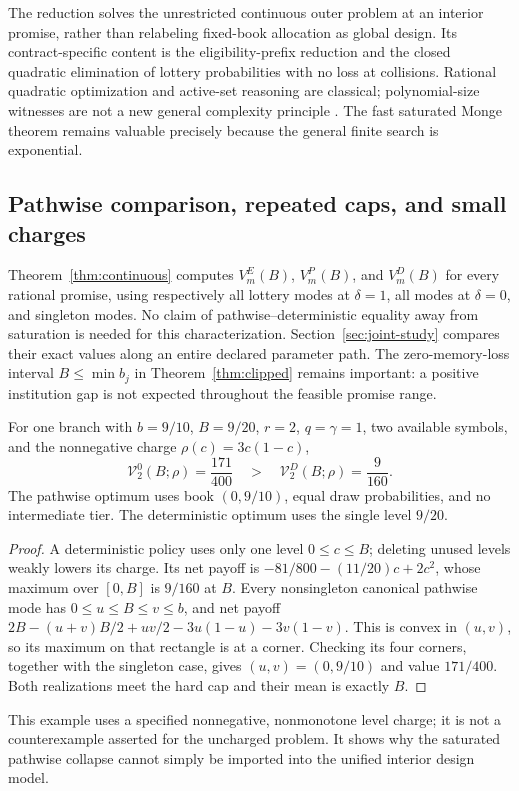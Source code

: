 The reduction solves the unrestricted continuous outer problem at an interior promise, rather than relabeling fixed-book allocation as global design. Its contract-specific content is the eligibility-prefix reduction and the closed quadratic elimination of lottery probabilities with no loss at collisions. Rational quadratic optimization and active-set reasoning are classical; polynomial-size witnesses are not a new general complexity principle \citep{DelPiaEtAl2017}. The fast saturated Monge theorem remains valuable precisely because the general finite search is exponential.

\subsection{Pathwise comparison, repeated caps, and small charges}
Theorem~\ref{thm:continuous} computes $V_m^E(B)$, $V_m^P(B)$, and $V_m^D(B)$ for every rational promise, using respectively all lottery modes at $\delta=1$, all modes at $\delta=0$, and singleton modes. No claim of pathwise--deterministic equality away from saturation is needed for this characterization. Section~\ref{sec:joint-study} compares their exact values along an entire declared parameter path. The zero-memory-loss interval $B\leq\min b_j$ in Theorem~\ref{thm:clipped} remains important: a positive institution gap is not expected throughout the feasible promise range.

\begin{proposition}\label{prop:pathwise-interior}
For one branch with $b=9/10$, $B=9/20$, $r=2$, $q=\gamma=1$, two available symbols, and the nonnegative charge $\rho(c)=3c(1-c)$,
\[
 \mathcal V_2^0(B;\rho)=\frac{171}{400}
 \quad>\quad
 \mathcal V_2^D(B;\rho)=\frac9{160}.
\]
The pathwise optimum uses book $(0,9/10)$, equal draw probabilities, and no intermediate tier. The deterministic optimum uses the single level $9/20$.
\end{proposition}
\begin{proof}
A deterministic policy uses only one level $0\leq c\leq B$; deleting unused levels weakly lowers its charge. Its net payoff is $-81/800-(11/20)c+2c^2$, whose maximum over $[0,B]$ is $9/160$ at $B$. Every nonsingleton canonical pathwise mode has $0\leq u\leq B\leq v\leq b$, and net payoff
$2B-(u+v)B/2+uv/2-3u(1-u)-3v(1-v)$.
This is convex in $(u,v)$, so its maximum on that rectangle is at a corner. Checking its four corners, together with the singleton case, gives $(u,v)=(0,9/10)$ and value $171/400$. Both realizations meet the hard cap and their mean is exactly $B$.
\end{proof}
This example uses a specified nonnegative, nonmonotone level charge; it is not a counterexample asserted for the uncharged problem. It shows why the saturated pathwise collapse cannot simply be imported into the unified interior design model.

